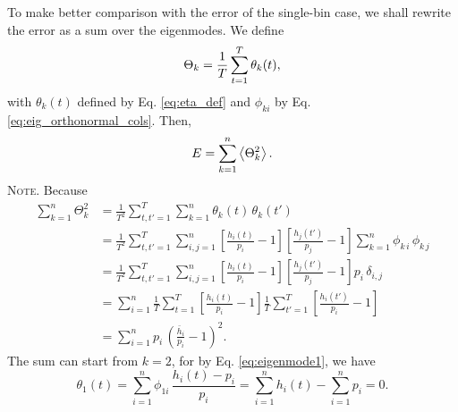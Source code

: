 \documentclass[reprint, floatfix]{revtex4-1}
\newcommand{\note}[1]{{\color{DarkGreen}\footnotesize \textsc{Note.} #1}}
\begin{document}
To make better comparison with
the error of the single-bin case,
we shall rewrite the error as
a sum over the eigenmodes.
We define
\begin{align}
  \Theta_k
  =
  \frac{ 1 } { T }
  \sum_{ t = 1 } ^ T
    \theta_k( t )
  ,
\notag
\end{align}
%
with $\theta_k(t)$ defined by Eq. \eqref{eq:eta_def}
and $\phi_{k i}$ by Eq. \eqref{eq:eig_orthonormal_cols}.
%
Then,
%
\begin{align}
  E
  =
  \sum_{ k = 1 }^n
    \left\langle
      \Theta_k^2
    \right\rangle.
\notag
\end{align}
%
\note{Because
%
\begin{align*}
\sum_{ k = 1 }^n
  \Theta_k^2
&=
\frac{ 1 } { T^2 }
\sum_{ t, t' = 1 }^T
  \sum_{ k = 1 }^n
    \theta_k( t ) \, \theta_k( t' )
\\
&=
\frac{ 1 } { T^2 }
\sum_{ t, t' = 1 }^T
  \sum_{ i, j = 1 }^n
    \left[
      \frac{ h_i(t) }
           { p_i    }
      - 1
    \right]
    \left[
      \frac{ h_j(t') }
           { p_j     }
      - 1
    \right]
    \sum_{ k = 1 }^n
      \phi_{k \, i} \, \phi_{k \, j}
\\
&=
\frac{ 1 } { T^2 }
\sum_{ t, t' = 1 }^T
  \sum_{ i, j = 1 }^n
    \left[
      \frac{ h_i(t) }
           { p_i    }
      - 1
    \right]
    \left[
      \frac{ h_j(t') }
           { p_j     }
      - 1
    \right]
    p_i \, \delta_{i, j}
\\
&=
\sum_{ i = 1 }^n
\frac{ 1 } { T }
\sum_{ t = 1 }^T
    \left[
      \frac{ h_i(t) }
           { p_i    }
      - 1
    \right]
\frac{ 1 } { T }
\sum_{ t' = 1 }^T
    \left[
      \frac{ h_i(t') }
           { p_i     }
      - 1
    \right]
\\
&=
\sum_{ i = 1 }^n
  p_i \,
    \left(
      \frac{ \bar h_i }
           { p_i      }
      - 1
    \right)^2
.
\end{align*}
}
The sum can start from $k = 2$, for
by Eq. \eqref{eq:eigenmode1}, we have
$$
\theta_1(t)
=
\sum_{ i = 1 }^n
  \phi_{1i} \, \frac{ h_i(t) - p_i } { p_i }
=
\sum_{ i = 1 }^n h_i(t)
-
\sum_{ i = 1 }^n p_i = 0.
$$
\end{document}
